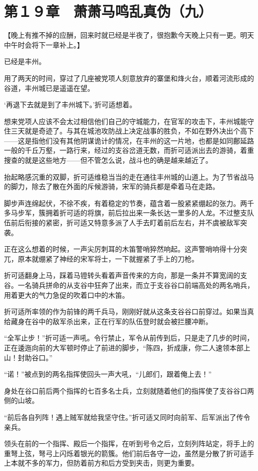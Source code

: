 \section{第１９章　萧萧马鸣乱真伪（九）}

【晚上有推不掉的应酬，回来时就已经是半夜了，很抱歉今天晚上只有一更。明天中午时会将下一章补上。】

已经是丰州。

用了两天的时间，穿过了几座被党项人刻意放弃的寨堡和烽火台，顺着河流形成的谷道，丰州城已是遥遥在望。

‘再退下去就是到了丰州城下。’折可适想着。

想来党项人应该不会太过相信他们自己的守城能力，在官军的攻击下，丰州城能守住三天就是奇迹了。与其在城池攻防战上决定战事的胜负，不如在野外决出个高下——这是指他们没有其他阴谋诡计的情况，在丰州的这一片地，也都是如同鄜延路一般的千丘万壑，一路行来，经过的支谷岔道无数，而折可适派出去的游骑，着重搜查的就是这些地方——但不管怎么说，战斗也的确是越来越近了。

抬起略感沉重的双脚，折可适维稳当当的走在通往丰州城的山道上。为了节省战马的脚力，除去了散在外面的斥候游骑，宋军的骑兵都是牵着马在走路。

脚步声连绵起伏，不徐不疾，有着稳定的节奏，蕴含着一股紧紧绷起的张力。两千多马步军，簇拥着折可适的将旗，前后拉出来一条长达一里多的人龙。不过整支队伍前后衔接的紧密，折可适又特意多派了人手去盯着前后左右，并不虞被敌军突袭。

正在这么想着的时候，一声尖厉刺耳的木笛警哨猝然响起。这声警哨响得十分突兀，原本就绷紧了神经的宋军将士，一下就握紧了手上的刀枪。

折可适翻身上马，踩着马镫转头看着声音传来的方向，那是一条并不算宽阔的支谷。一名骑兵拼命的从支谷中狂奔了出来，而立于支谷谷口前端高处的两名哨兵，用着更大的气力急促的吹着口中的木笛。

折可适所率领的作为前锋的两千兵马，刚刚好就从这条支谷谷口前穿过。如果当真给藏身在谷中的敌军杀出来，正在行军的队伍登时就会被拦腰冲断。

“全军止步！”折可适一声吼。令行禁止，军令从前传到后，只是走了几步的时间，正在逶迤向前的大军顿时停止了前进的脚步，“陈四，折成康，你二人速领本部上山！封助谷口。”

“诺！”被点到的两名指挥使回头一声大吼，“儿郎们，跟着俺上去！”

身处在谷口前后两个指挥的七百多名士兵，立刻就随着他们的指挥使了支谷谷口两侧的山坡。

“前后各自列阵！遇上贼军就给我坚守住。”折可适又同时向前军、后军派出了传令亲兵。

领头在前的一个指挥、殿后一个指挥，在听到号令之后，立刻列阵站定，将手上的重弩上弦，弩弓上闪烁着银光的箭簇。他们前后各守一边，虽然是分散了折可适手上本就不多的军力，但防着前方和后方受到夹击，则更为重要。

